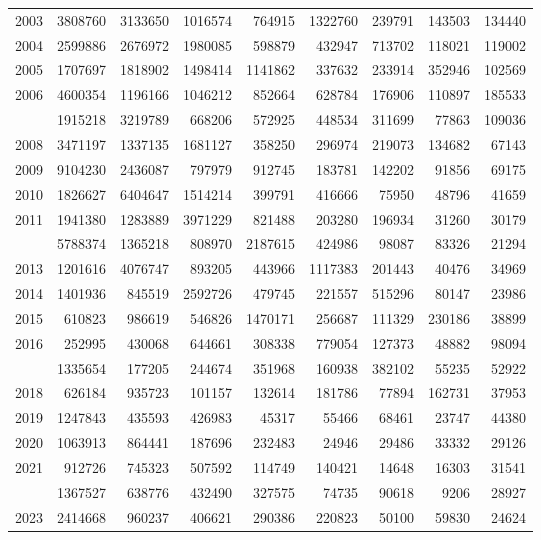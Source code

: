\documentclass[
]{article}
\begin{document}
\begin{longtable}[t]{lrrrrrrrr}
2003 & 3808760 & 3133650 & 1016574 & 764915 & 1322760 & 239791 & 143503 & 134440\\
2004 & 2599886 & 2676972 & 1980085 & 598879 & 432947 & 713702 & 118021 & 119002\\
2005 & 1707697 & 1818902 & 1498414 & 1141862 & 337632 & 233914 & 352946 & 102569\\
2006 & 4600354 & 1196166 & 1046212 & 852664 & 628784 & 176906 & 110897 & 185533\\
\addlinespace
2007 & 1915218 & 3219789 & 668206 & 572925 & 448534 & 311699 & 77863 & 109036\\
2008 & 3471197 & 1337135 & 1681127 & 358250 & 296974 & 219073 & 134682 & 67143\\
2009 & 9104230 & 2436087 & 797979 & 912745 & 183781 & 142202 & 91856 & 69175\\
2010 & 1826627 & 6404647 & 1514214 & 399791 & 416666 & 75950 & 48796 & 41659\\
2011 & 1941380 & 1283889 & 3971229 & 821488 & 203280 & 196934 & 31260 & 30179\\
\addlinespace
2012 & 5788374 & 1365218 & 808970 & 2187615 & 424986 & 98087 & 83326 & 21294\\
2013 & 1201616 & 4076747 & 893205 & 443966 & 1117383 & 201443 & 40476 & 34969\\
2014 & 1401936 & 845519 & 2592726 & 479745 & 221557 & 515296 & 80147 & 23986\\
2015 & 610823 & 986619 & 546826 & 1470171 & 256687 & 111329 & 230186 & 38899\\
2016 & 252995 & 430068 & 644661 & 308338 & 779054 & 127373 & 48882 & 98094\\
\addlinespace
2017 & 1335654 & 177205 & 244674 & 351968 & 160938 & 382102 & 55235 & 52922\\
2018 & 626184 & 935723 & 101157 & 132614 & 181786 & 77894 & 162731 & 37953\\
2019 & 1247843 & 435593 & 426983 & 45317 & 55466 & 68461 & 23747 & 44380\\
2020 & 1063913 & 864441 & 187696 & 232483 & 24946 & 29486 & 33332 & 29126\\
2021 & 912726 & 745323 & 507592 & 114749 & 140421 & 14648 & 16303 & 31541\\
\addlinespace
2022 & 1367527 & 638776 & 432490 & 327575 & 74735 & 90618 & 9206 & 28927\\
2023 & 2414668 & 960237 & 406621 & 290386 & 220823 & 50100 & 59830 & 24624\\*
\end{longtable}
\end{document}
